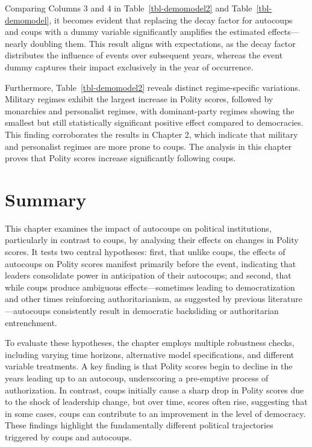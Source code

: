 \documentclass[
  12pt,
]{report}
\begin{document}
Comparing Columns 3 and 4 in Table~\ref{tbl-demomodel2} and
Table~\ref{tbl-demomodel}, it becomes evident that replacing the decay
factor for autocoups and coups with a dummy variable significantly
amplifies the estimated effects---nearly doubling them. This result
aligns with expectations, as the decay factor distributes the influence
of events over subsequent years, whereas the event dummy captures their
impact exclusively in the year of occurrence.

Furthermore, Table~\ref{tbl-demomodel2} reveals distinct regime-specific
variations. Military regimes exhibit the largest increase in Polity
scores, followed by monarchies and personalist regimes, with
dominant-party regimes showing the smallest but still statistically
significant positive effect compared to democracies. This finding
corroborates the results in Chapter 2, which indicate that military and
personalist regimes are more prone to coups. The analysis in this
chapter proves that Polity scores increase significantly following
coups.

\section{Summary}\label{summary-3}

This chapter examines the impact of autocoups on political institutions,
particularly in contrast to coups, by analysing their effects on changes
in Polity scores. It tests two central hypotheses: first, that unlike
coups, the effects of autocoups on Polity scores manifest primarily
before the event, indicating that leaders consolidate power in
anticipation of their autocoups; and second, that while coups produce
ambiguous effects---sometimes leading to democratization and other times
reinforcing authoritarianism, as suggested by previous
literature---autocoups consistently result in democratic backsliding or
authoritarian entrenchment.

To evaluate these hypotheses, the chapter employs multiple robustness
checks, including varying time horizons, alternative model
specifications, and different variable treatments. A key finding is that
Polity scores begin to decline in the years leading up to an autocoup,
underscoring a pre-emptive process of authorization. In contrast, coups
initially cause a sharp drop in Polity scores due to the shock of
leadership change, but over time, scores often rise, suggesting that in
some cases, coups can contribute to an improvement in the level of
democracy. These findings highlight the fundamentally different
political trajectories triggered by coups and autocoups.
\end{document}
